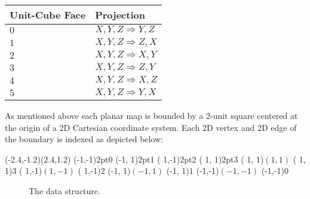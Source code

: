 \begin{tabular}{ll}
Unit-Cube Face & Projection\\
\hline
$0$ & $X,Y,Z \Rightarrow Y,Z$\\
$1$ & $X,Y,Z \Rightarrow Z,X$\\
$2$ & $X,Y,Z \Rightarrow X,Y$\\
$3$ & $X,Y,Z \Rightarrow Z,Y$\\
$4$ & $X,Y,Z \Rightarrow X,Z$\\
$5$ & $X,Y,Z \Rightarrow Y,X$\\
\end{tabular}

As mentioned above each planar map is bounded by a 2-unit square centered at
the origin of a 2D Cartesian coordinate system. Each 2D vertex and 2D edge of
the boundary is indexed as depicted below:

\pspicture[](-2.4,-1.2)(2.4,1.2)
\cnode*(-1,-1){2pt}{0}
\cnode*(-1, 1){2pt}{1}
\cnode*( 1,-1){2pt}{2}
\cnode*( 1, 1){2pt}{3}
( 1, 1){$( 1, 1)$}
( 1, 1){$3$}
( 1,-1){$( 1,-1)$}
( 1,-1){$2$}
(-1, 1){$(-1, 1)$}
(-1, 1){$1$}
(-1,-1){$(-1,-1)$}
(-1,-1){$0$}
\endpspicture

\begin{wrapfigure}{l}{8.4cm}
  \vspace{-1.5ex}
  \scalebox{0.5 0.5}{
    
  }
  \caption{\sf The data structure.}
  \vspace{-2ex}
  \label{fig:data_struct}
\end{wrapfigure}
